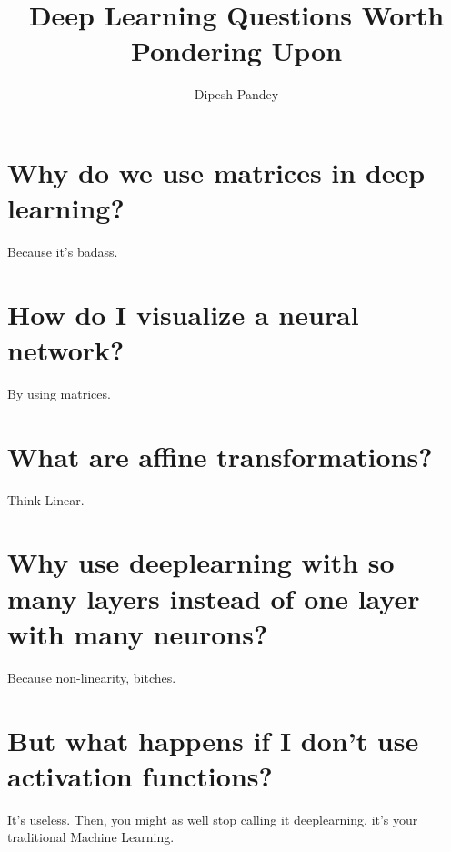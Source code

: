 \documentclass[11pt, oneside]{article}   	%
\title{Deep Learning Questions Worth Pondering Upon}
\author{Dipesh Pandey}
\date{}							%
\begin{document}
\maketitle

\section{Why do we use matrices in deep learning?}
Because it's badass.

\section{How do I visualize a neural network?}
By using matrices.

\section{What are affine transformations?}
Think Linear.

\section{Why use deeplearning with so many layers instead of one layer with many neurons?}
Because non-linearity, bitches.

\section{But what happens if I don't use activation functions?}
It's useless. Then, you might as well stop calling it deeplearning, it's your traditional Machine Learning.
\end{document}

